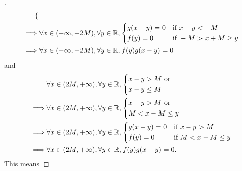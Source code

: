 \begin{proof}[]
\begin{align*}
\begin{dcases}
                                                               \end{dcases}                      \\
    \implies & \forall x \in (-\infty, -2M), \forall y \in \mathbb{R}, \begin{dcases}
                                                                 g(x - y) = 0 & \text{if } x - y < -M        \\
                                                                 f(y) = 0     & \text{if } -M > x + M \geq y
                                                               \end{dcases} \\
    \implies & \forall x \in (-\infty, -2M), \forall y \in \mathbb{R}, f(y) g(x - y) = 0
  \end{align*}
  and
  \begin{align*}
             & \forall x \in (2M, +\infty), \forall y \in \mathbb{R}, \begin{dcases}
                                                                x - y > M \text{ or } \\
                                                                x - y \leq M
                                                              \end{dcases}                      \\
    \implies & \forall x \in (2M, +\infty), \forall y \in \mathbb{R}, \begin{dcases}
                                                                x - y > M \text{ or } \\
                                                                M < x - M \leq y
                                                              \end{dcases}                      \\
    \implies & \forall x \in (2M, +\infty), \forall y \in \mathbb{R}, \begin{dcases}
                                                                g(x - y) = 0 & \text{if } x - y > M        \\
                                                                f(y) = 0     & \text{if } M < x - M \leq y
                                                              \end{dcases} \\
    \implies & \forall x \in (2M, +\infty), \forall y \in \mathbb{R}, f(y) g(x - y) = 0.
  \end{align*}
  This means

\end{proof}
